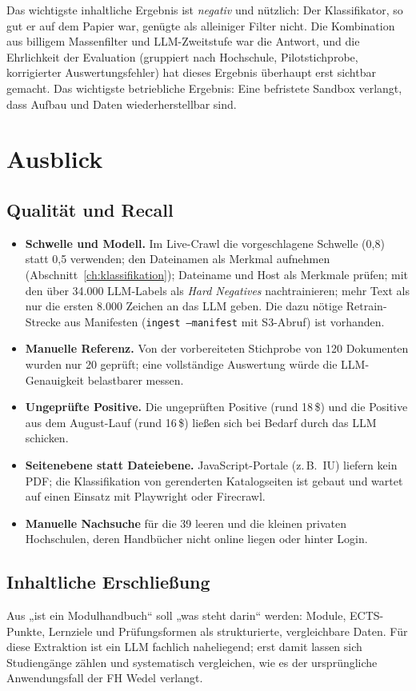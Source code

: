 Das wichtigste inhaltliche Ergebnis ist \emph{negativ} und nützlich: Der Klassifikator, so gut er auf dem Papier war, genügte als alleiniger Filter nicht. Die Kombination aus billigem Massenfilter und LLM-Zweitstufe war die Antwort, und die Ehrlichkeit der Evaluation (gruppiert nach Hochschule, Pilotstichprobe, korrigierter Auswertungsfehler) hat dieses Ergebnis überhaupt erst sichtbar gemacht. Das wichtigste betriebliche Ergebnis: Eine befristete Sandbox verlangt, dass Aufbau und Daten wiederherstellbar sind.

\section{Ausblick}
\subsection{Qualität und Recall}
\begin{itemize}
  \item \textbf{Schwelle und Modell.} Im Live-Crawl die vorgeschlagene Schwelle (0,8) statt 0,5 verwenden; den Dateinamen als Merkmal aufnehmen (Abschnitt~\ref{ch:klassifikation}); Dateiname und Host als Merkmale prüfen; mit den über 34.000 LLM-Labels als \emph{Hard Negatives} nachtrainieren; mehr Text als nur die ersten 8.000 Zeichen an das LLM geben. Die dazu nötige Retrain-Strecke aus Manifesten (\texttt{ingest --manifest} mit S3-Abruf) ist vorhanden.
  \item \textbf{Manuelle Referenz.} Von der vorbereiteten Stichprobe von 120 Dokumenten wurden nur 20 geprüft; eine vollständige Auswertung würde die LLM-Genauigkeit belastbarer messen.
  \item \textbf{Ungeprüfte Positive.} Die \zTfidfHigh{} ungeprüften Positive (rund 18\,\$) und die \zTfidfOther{} Positive aus dem August-Lauf (rund 16\,\$) ließen sich bei Bedarf durch das LLM schicken.
  \item \textbf{Seitenebene statt Dateiebene.} JavaScript-Portale (z.\,B.\ IU) liefern kein PDF; die Klassifikation von gerenderten Katalogseiten ist gebaut und wartet auf einen Einsatz mit Playwright oder Firecrawl.
  \item \textbf{Manuelle Nachsuche} für die 39 leeren und die kleinen privaten Hochschulen, deren Handbücher nicht online liegen oder hinter Login.
\end{itemize}

\subsection{Inhaltliche Erschließung}
Aus „ist ein Modulhandbuch“ soll „was steht darin“ werden: Module, ECTS-Punkte, Lernziele und Prüfungsformen als strukturierte, vergleichbare Daten. Für diese Extraktion ist ein LLM fachlich naheliegend; erst damit lassen sich Studiengänge zählen und systematisch vergleichen, wie es der ursprüngliche Anwendungsfall der FH Wedel verlangt.

